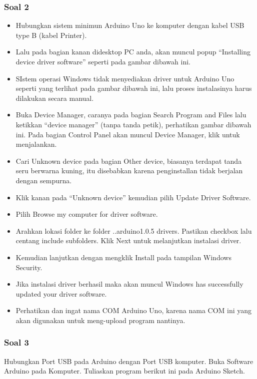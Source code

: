 \subsubsection{Soal 2}
\begin{itemize}
\item Hubungkan sistem minimun Arduino Uno ke komputer dengan kabel USB type B (kabel Printer).
\item Lalu pada bagian kanan didesktop PC anda, akan muncul popup “Installing device driver software” seperti pada gambar dibawah ini.
\item SIstem operasi Windows tidak menyediakan driver untuk Arduino Uno seperti yang terlihat pada gambar dibawah ini, lalu proses instalasinya harus dilakukan secara manual.
\item Buka Device Manager, caranya pada bagian Search Program and Files lalu ketikkan “device manager” (tanpa tanda petik), perhatikan gambar dibawah ini. Pada bagian Control Panel akan muncul Device Manager, klik untuk menjalankan.
\item Cari Unknown device pada bagian Other device, biasanya terdapat tanda seru berwarna kuning, itu disebabkan karena penginstallan tidak berjalan dengan sempurna.
\item Klik kanan pada “Unknown device” kemudian pilih Update Driver Software.
\item Pilih Browse my computer for driver software.
\item Arahkan lokasi folder ke folder ..arduino1.0.5 drivers. Pastikan checkbox lalu centang include subfolders. Klik Next untuk melanjutkan instalasi driver.
\item Kemudian lanjutkan dengan mengklik Install pada tampilan Windows Security.
\item Jika instalasi driver berhasil maka akan muncul Windows has successfully updated your driver software.
\item Perhatikan dan ingat nama COM Arduino Uno, karena nama COM ini yang akan digunakan untuk meng-upload program nantinya.
\end{itemize}

\subsubsection{Soal 3}
Hubungkan Port USB pada Arduino dengan Port USB komputer.
Buka Software Arduino pada Komputer.
Tuliaskan program berikut ini pada Arduino Sketch.

